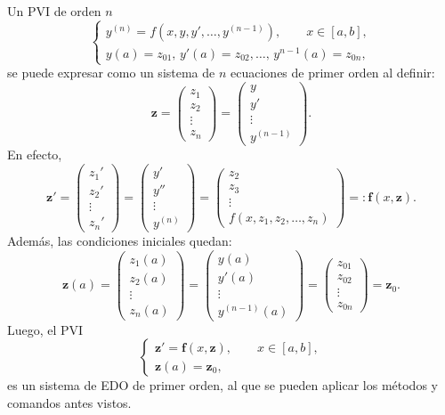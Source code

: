 \documentclass[letter,11pt]{article}
\begin{document}
Un PVI de orden $n$
$$
\left\{
\begin{array}{l}
y^{(n)}=f\left(x,y,y',\ldots,y^{(n-1)}\right), \qquad x\in[a,b],\\
y(a)=z_{01},\,y'(a)=z_{02},\ldots,\,y^{n-1}(a)=z_{0n},
\end{array}
\right.
$$
se puede expresar como un sistema de $n$ ecuaciones de primer orden al definir:
$$
\boldsymbol{z}=
\left(
\begin{array}{c}
z_1\\
z_2\\
\vdots\\
z_n
\end{array}
\right)
=\left(
\begin{array}{c}
y\\
y'\\
\vdots\\
y^{(n-1)}
\end{array}
\right).
$$
En efecto,
$$
\boldsymbol{z}'=
\left(
\begin{array}{c}
z_1'\\
z_2'\\
\vdots\\
z_n'
\end{array}
\right)
=\left(
\begin{array}{c}
y'\\
y''\\
\vdots\\
y^{(n)}
\end{array}
\right)
=\left(
\begin{array}{c}
z_2\\
z_3\\
\vdots\\
f(x,z_1,z_2,\ldots,z_n)
\end{array}
\right)=: \boldsymbol{f}(x,\boldsymbol{z}).
$$
Adem\'as, las condiciones iniciales quedan:
$$
\boldsymbol{z}(a)=
\left(
\begin{array}{c}
z_1(a)\\
z_2(a)\\
\vdots\\
z_n(a)
\end{array}
\right)
=\left(
\begin{array}{c}
y(a)\\
y'(a)\\
\vdots\\
y^{(n-1)}(a)
\end{array}
\right)
=\left(
\begin{array}{c}
z_{01}\\
z_{02}\\
\vdots\\
z_{0n}
\end{array}
\right)=\boldsymbol{z}_0.
$$
Luego, el PVI
$$
\left\{
\begin{array}{l}
\boldsymbol{z}'=\boldsymbol{f}(x,\boldsymbol{z}),\qquad x\in[a,b],\\
\boldsymbol{z}(a)=\boldsymbol{z}_0,
\end{array}
\right.
$$
es un sistema de EDO de primer orden, al que se pueden aplicar los m\'etodos y comandos antes vistos.
\end{document}
